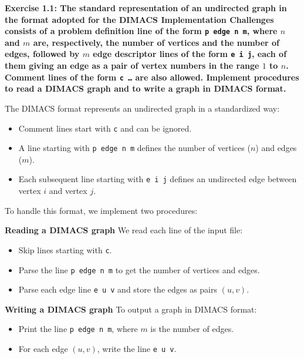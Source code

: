 \documentclass{article}
\begin{document}
\textbf{Exercise 1.1: The standard representation of an undirected graph in the format adopted for the DIMACS Implementation Challenges consists of a problem definition line of the form \texttt{p edge n m}, where $n$ and $m$ are, respectively, the number of vertices and the number of edges, followed by $m$ edge descriptor lines of the form \texttt{e i j}, each of them giving an edge as a pair of vertex numbers in the range $1$ to $n$. Comment lines of the form \texttt{c …} are also allowed. Implement procedures to read a DIMACS graph and to write a graph in DIMACS format.}

The DIMACS format represents an undirected graph in a standardized way:
\begin{itemize}
    \item Comment lines start with \texttt{c} and can be ignored.
    \item A line starting with \texttt{p edge n m} defines the number of vertices ($n$) and edges ($m$).
    \item Each subsequent line starting with \texttt{e i j} defines an undirected edge between vertex $i$ and vertex $j$.
\end{itemize}

To handle this format, we implement two procedures:

\textbf{Reading a DIMACS graph}
We read each line of the input file:
\begin{itemize}
    \item Skip lines starting with \texttt{c}.
    \item Parse the line \texttt{p edge n m} to get the number of vertices and edges.
    \item Parse each edge line \texttt{e u v} and store the edges as pairs $(u,v)$.
\end{itemize}

\textbf{Writing a DIMACS graph}
To output a graph in DIMACS format:
\begin{itemize}
    \item Print the line \texttt{p edge n m}, where $m$ is the number of edges.
    \item For each edge $(u, v)$, write the line \texttt{e u v}.
\end{itemize}
\end{document}
